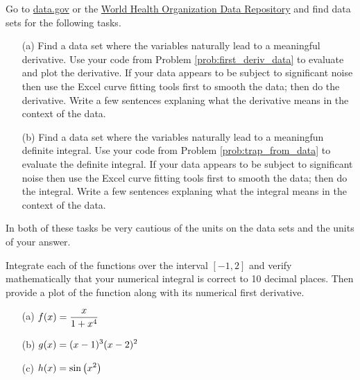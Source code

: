 \begin{problem}
    Go to \href{https://www.data.gov/}{data.gov} or the
    \href{http://apps.who.int/gho/data/?theme=home}{World Health Organization Data
    Repository} and find data sets for the following tasks.
    \begin{enumerate}
        \item[(a)] Find a data set where the variables naturally lead to a meaningful
            derivative.  Use your code from Problem  \ref{prob:first_deriv_data} to
            evaluate and plot the derivative.  If your data appears to be subject to
            significant noise then use the Excel curve fitting tools first to smooth the
            data; then do the derivative.  Write a few sentences explaning what the
            derivative means in the context of the data.
        \item[(b)] Find a data set where the variables naturally lead to a meaningfun
            definite integral.  Use your code from Problem \ref{prob:trap_from_data} to
            evaluate the definite integral.  If your data appears to be subject to
            significant noise then use the Excel curve fitting tools first to smooth the
            data; then do the integral.  Write a few sentences explaning what the
            integral means in the context of the data.
    \end{enumerate}
    In both of these tasks be very cautious of the units on the data sets and the units of
    your answer. 
\end{problem}





\begin{problem}
    Integrate each of the functions over the interval $[-1,2]$ and verify mathematically
    that your numerical integral is correct to 10 decimal places.  Then provide a plot of
    the function along with its numerical first derivative.
    \begin{enumerate}
        \item[(a)] $\displaystyle f(x) = \frac{x}{1+x^4}$
        \item[(b)] $\displaystyle g(x) = (x-1)^3 (x-2)^2$
        \item[(c)] $\displaystyle h(x) = \sin\left(x^2\right)$
    \end{enumerate}
\end{problem}


